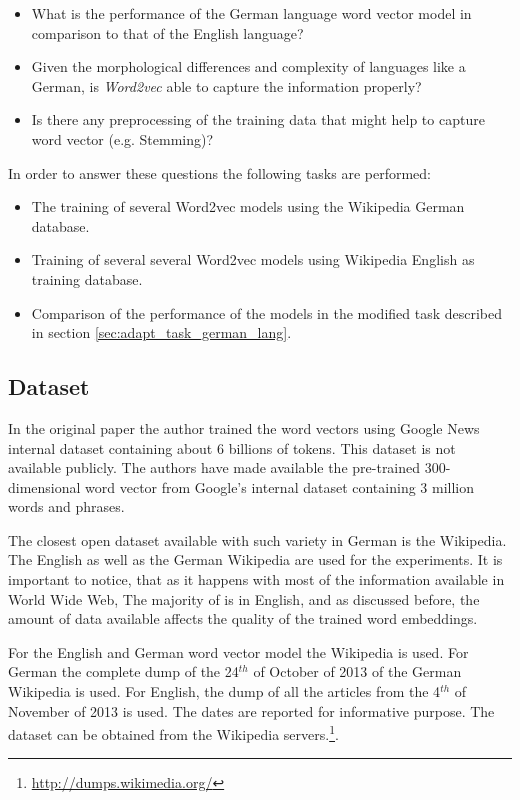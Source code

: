 \begin{itemize}
\item What is the performance of the German language word vector model in comparison to that of
  the English language?
\item Given the morphological differences and complexity of languages like
  a German, is \textit{Word2vec} able to capture the information properly?
\item Is there any preprocessing of the training data  that might help to capture word vector
  (e.g. Stemming)?
\end{itemize}

In order to answer these questions the following tasks are performed:

\begin{itemize}
\item The training of several Word2vec models using the Wikipedia German
  database.
\item Training of several several Word2vec models using Wikipedia English as
  training  database.
\item Comparison of the performance of the models in the modified task
  described in section \ref{sec:adapt_task_german_lang}.
\end{itemize}


\subsection{Dataset}
\label{experiments:sub:dataset}

In the original paper \cite{DBLP:journals/corr/abs-1301-3781} the author
trained the word vectors using Google News internal dataset containing about
6 billions of tokens. This dataset is not available publicly. The authors have made
available the pre-trained 300-dimensional  word vector  from  Google's internal
dataset containing 3 million words and phrases.

The closest open dataset available with such variety in German is the
Wikipedia. The English  as well as the German Wikipedia are used for the experiments.  It is
important to notice, that as it happens with most of the information
available in World Wide Web, The majority of is in English, and as discussed
before, the amount of data available affects the quality  of the trained word embeddings. 

For the English and German word vector model  the Wikipedia is used. For
German the complete dump of the 24$^{th}$ of October of 2013 of the German
Wikipedia is used.  For English, the dump of all the articles from the
4$^{th}$ of November of 2013 is used. The dates are reported for informative
purpose. The dataset can be obtained from the Wikipedia
servers.\footnote{\url{http://dumps.wikimedia.org/}}.

